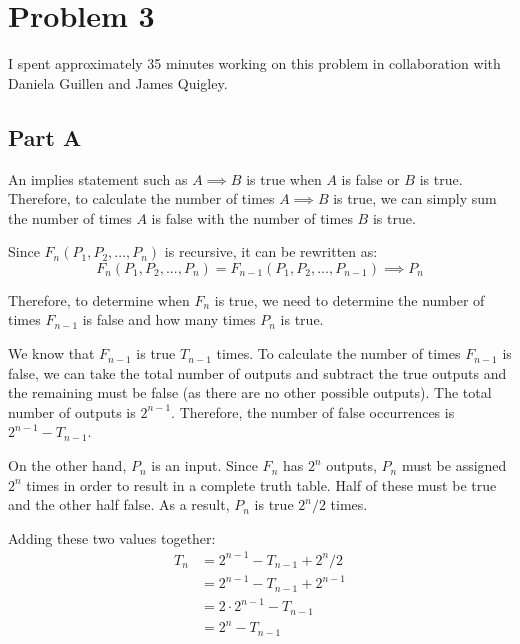 \documentclass{article}
\begin{document}
\section*{Problem 3}

I spent approximately 35 minutes working on this problem in collaboration with
Daniela Guillen and James Quigley.

\subsection*{Part A}

An implies statement such as $A \implies B$ is true when $A$ is false or $B$ is
true. Therefore, to calculate the number of times $A \implies B$ is true, we can
simply sum the number of times $A$ is false with the number of times $B$ is
true.

\bigbreak

Since $F_{n}(P_{1}, P_{2}, ..., P_{n})$ is recursive, it can be rewritten as:
$$ F_{n}(P_{1}, P_{2}, ..., P_{n}) = F_{n - 1}(P_{1}, P_{2}, ..., P_{n - 1})
\implies P_{n} $$

Therefore, to determine when $F_{n}$ is true, we need to determine the number of
times $F_{n-1}$ is false and how many times $P_{n}$ is true.

\bigbreak

We know that $F_{n - 1}$ is true $T_{n - 1}$ times. To calculate the number of
times $F_{n - 1}$ is false, we can take the total number of outputs and subtract
the true outputs and the remaining must be false (as there are no other possible
outputs). The total number of outputs is $2^{n - 1}$. Therefore, the number of
false occurrences is $2^{n - 1} - T_{n - 1}$.

\bigbreak

On the other hand, $P_{n}$ is an input. Since $F_{n}$ has $2^{n}$ outputs,
$P_{n}$ must be assigned $2^{n}$ times in order to result in a complete truth
table. Half of these must be true and the other half false. As a result, $P_{n}$
is true $2^{n}/2$ times.

\bigbreak

Adding these two values together:
\begin{align*}
  T_{n} &= 2^{n - 1} - T_{n - 1} + 2^{n} / 2 \\
        &= 2^{n - 1} - T_{n - 1} + 2^{n - 1} \\
        &= 2 \cdot 2^{n - 1} - T_{n - 1} \\
        &= 2^{n} - T_{n - 1}
\end{align*}
\end{document}

